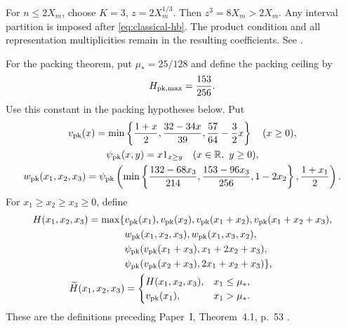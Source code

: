 For $n\le2X_m$, choose $K=3$, $z=2X_m^{1/3}$.
Then $z^3=8X_m>2X_m$.
Any interval partition is imposed after \eqref{eq:classical-hb}.
The product condition and all representation multiplicities remain in
the resulting coefficients. See \cite[(2.36)--(2.37), p.~13]{PaperI}.

For the packing theorem, put $\mu_*=25/128$ and define the packing ceiling by
\[
 H_{\rm pk,max}=\frac{153}{256}.
\]
Use this constant in the packing hypotheses below. Put
\begin{equation}\label{eq:classical-packing-functions}
 \begin{gathered}
 v_{\rm pk}(x)=\min\left\{\frac{1+x}{2},\frac{32-34x}{39},
                         \frac{57}{64}-\frac32x\right\}\quad(x\ge0),\\
 \psi_{\rm pk}(x,y)=x1_{x\ge y}\quad(x\in\mathbb R,\ y\ge0),\\
 w_{\rm pk}(x_1,x_2,x_3)=\psi_{\rm pk}\left(\min\left\{
 \frac{132-68x_3}{214},\frac{153-96x_3}{256},1-2x_2\right\},\frac{1+x_1}{2}\right).
 \end{gathered}
\end{equation}
For $x_1\ge x_2\ge x_3\ge0$, define
\begin{equation}\label{eq:classical-packing-ceiling}
 \begin{aligned}
 H(x_1,x_2,x_3)=\max\{&v_{\rm pk}(x_1),v_{\rm pk}(x_2),
 v_{\rm pk}(x_1+x_2),v_{\rm pk}(x_1+x_2+x_3),\\
 &w_{\rm pk}(x_1,x_2,x_3),w_{\rm pk}(x_1,x_3,x_2),\\
 &\psi_{\rm pk}(v_{\rm pk}(x_1+x_3),x_1+2x_2+x_3),\\
 &\psi_{\rm pk}(v_{\rm pk}(x_2+x_3),2x_1+x_2+x_3)\},\\
 \widetilde H(x_1,x_2,x_3)&=
 \begin{cases}H(x_1,x_2,x_3),&x_1\le\mu_*,\\v_{\rm pk}(x_1),&x_1>\mu_*.
 \end{cases}
 \end{aligned}
\end{equation}
These are the definitions preceding Paper~I, Theorem~4.1, p.~53
\cite[p.~53]{PaperI}.

